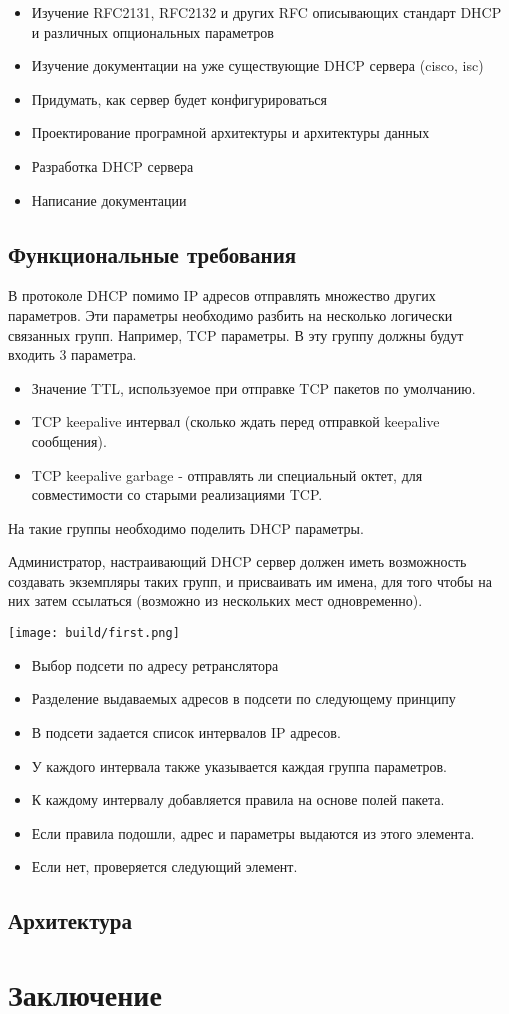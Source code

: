 \documentclass[12pt]{article}
\begin{document}
\begin{itemize}
    \item Изучение RFC2131, RFC2132 и других RFC описывающих стандарт DHCP и различных опциональных параметров
    \item Изучение документации на уже существующие DHCP сервера (cisco, isc)
    \item Придумать, как сервер будет конфигурироваться
    \item Проектирование програмной архитектуры и архитектуры данных
    \item Разработка DHCP сервера
    \item Написание документации
\end{itemize}

\subsection{Функциональные требования}

В протоколе DHCP помимо IP адресов отправлять множество других параметров.
Эти параметры необходимо разбить на несколько логически связанных групп.
Например, TCP параметры. В эту группу должны будут входить 3 параметра.

\begin{itemize}
    \item Значение TTL, используемое при отправке TCP пакетов по умолчанию.
    \item TCP keepalive интервал (сколько ждать перед отправкой keepalive сообщения).
    \item TCP keepalive garbage - отправлять ли специальный октет, для совместимости со старыми реализациями TCP.
\end{itemize}

На такие группы необходимо поделить DHCP параметры.

Администратор, настраивающий DHCP сервер должен иметь возможность создавать экземпляры таких групп, и присваивать им имена, для того чтобы на них затем ссылаться (возможно из нескольких мест одновременно).

\texttt{[image: build/first.png]}

\begin{itemize}
    \item Выбор подсети по адресу ретранслятора
    \item Разделение выдаваемых адресов в подсети по следующему принципу
        \item В подсети задается список интервалов IP адресов.
        \item У каждого интервала также указывается каждая группа параметров.
        \item К каждому интервалу добавляется правила на основе полей пакета.
        \item Если правила подошли, адрес и параметры выдаются из этого элемента.
        \item Если нет, проверяется следующий элемент.
\end{itemize}

\subsection{Архитектура}

\pagebreak
\section{Заключение}
\end{document}
